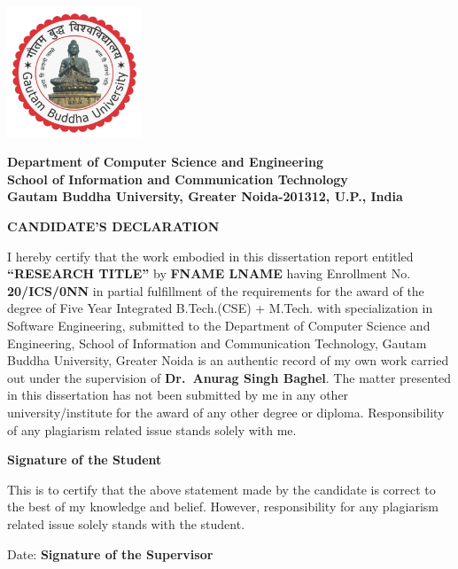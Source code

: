\begin{center}
	\vspace*{-1.5cm}
	\includegraphics[width=4cm]{figures/GBU_logo.png} %

	{\normalsize
		\textbf{Department of Computer Science and Engineering\\
			School of Information and Communication Technology\\
			Gautam Buddha University,
			Greater Noida-201312, U.P., India
		}}\\  %

	\vspace{1cm} %

  {\LARGE\textbf{CANDIDATE'S DECLARATION}} %

\end{center}
{
\setlength{\baselineskip}{20pt}

I hereby certify that the work embodied in this dissertation report entitled
\textbf{``RESEARCH TITLE''} by \textbf{FNAME LNAME} having Enrollment No. \textbf{20/ICS/0NN} in partial fulfillment of the requirements for the award of the degree of Five Year Integrated B.Tech.(CSE) + M.Tech. with specialization in Software Engineering, submitted to the Department of Computer Science and Engineering, School of Information and Communication Technology, Gautam Buddha University, Greater Noida is an authentic record of my own work carried out under the supervision of \textbf{Dr.~Anurag Singh Baghel}. The matter presented in this dissertation has not been submitted by me in any other university/institute for the award of any other degree or diploma.
Responsibility of any plagiarism related issue stands solely with me.

\vspace{1cm} %

\hfill \textbf{Signature of the Student}

This is to certify that the above statement made by the candidate is correct to the best of my knowledge and belief. However, responsibility for any plagiarism related issue solely stands with the student.

\vspace{1cm} %

Date: \hfill \textbf{Signature of the Supervisor}

}
